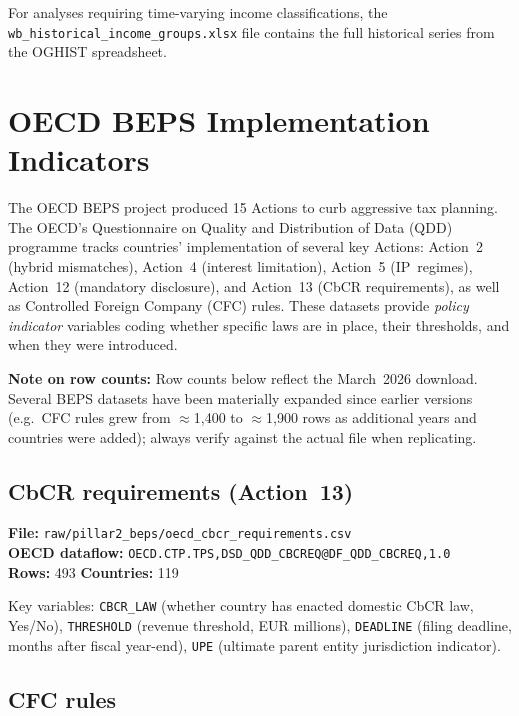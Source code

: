 \documentclass[11pt,a4paper]{article}
\newcommand{\code}[1]{\texttt{#1}}
\begin{document}
For analyses requiring time-varying income classifications, the \texttt{wb\_historical\_income\_groups.xlsx} file contains the full historical series from the OGHIST spreadsheet.


\section{OECD BEPS Implementation Indicators}\label{sec:beps}

The OECD BEPS project produced 15 Actions to curb aggressive tax planning.
The OECD's Questionnaire on Quality and Distribution of Data (QDD) programme
tracks countries' implementation of several key Actions: Action~2 (hybrid
mismatches), Action~4 (interest limitation), Action~5 (IP~regimes),
Action~12 (mandatory disclosure), and Action~13 (CbCR requirements), as well
as Controlled Foreign Company (CFC) rules.  These datasets provide
\emph{policy indicator} variables coding whether specific laws are in place,
their thresholds, and when they were introduced.

\noindent\textbf{Note on row counts:} Row counts below reflect the March~2026
download.  Several BEPS datasets have been materially expanded since earlier
versions (e.g.\ CFC rules grew from $\approx$1{,}400 to $\approx$1{,}900 rows
as additional years and countries were added); always verify against the actual
file when replicating.

\subsection{CbCR requirements (Action~13)}

\textbf{File:} \texttt{raw/pillar2\_beps/oecd\_cbcr\_requirements.csv}\\
\textbf{OECD dataflow:} \texttt{OECD.CTP.TPS,DSD\_QDD\_CBCREQ@DF\_QDD\_CBCREQ,1.0}\\
\textbf{Rows:} 493 \quad \textbf{Countries:} 119

Key variables: \code{CBCR\_LAW} (whether country has enacted domestic CbCR law, Yes/No), \code{THRESHOLD} (revenue threshold, EUR millions), \code{DEADLINE} (filing deadline, months after fiscal year-end), \code{UPE} (ultimate parent entity jurisdiction indicator).

\subsection{CFC rules}
\end{document}
